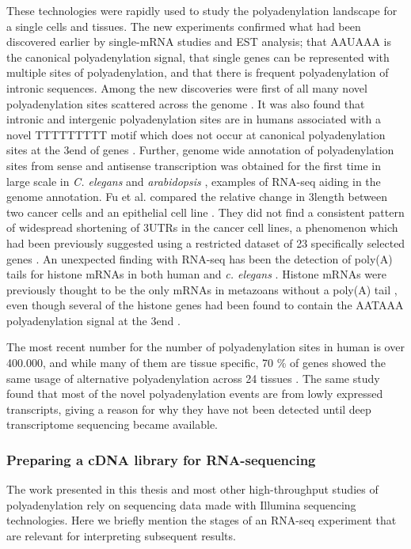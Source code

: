 These technologies were rapidly used to study the polyadenylation landscape for
a single cells and tissues. The new experiments confirmed what had been
discovered earlier by single-mRNA studies and EST analysis; that AAUAAA is the
canonical polyadenylation signal, that single genes can be represented with
multiple sites of polyadenylation, and that there is frequent polyadenylation
of intronic sequences. Among the new discoveries were first of all many novel
polyadenylation sites scattered across the genome
\cite{ozsolak_comprehensive_2010, derti_quantitative_2012}. It was also found
that intronic and intergenic polyadenylation sites are in humans associated
with a novel TTTTTTTTT motif which does not occur at canonical polyadenylation
sites at the 3\p end of genes \cite{ozsolak_comprehensive_2010}. Further,
genome wide annotation of polyadenylation sites from sense and antisense
transcription was obtained for the first time in large scale in \textit{C.
elegans} and \textit{arabidopsis} \cite{mangone_landscape_2010,
wu_genome-wide_2011}, examples of RNA-seq aiding in the genome annotation. Fu
et al. compared the relative change in 3\p length between two cancer cells and
an epithelial cell line \cite{fu_differential_2011}. They did not find a
consistent pattern of widespread shortening of 3\p UTRs in the cancer cell
lines, a phenomenon which had been previously suggested using a restricted
dataset of 23 specifically selected genes \cite{mayr_widespread_2009-2}. An
unexpected finding with RNA-seq has been the detection of poly(A) tails for
histone mRNAs in both human and \textit{c. elegans}
\cite{mangone_landscape_2010-1, shepard_complex_2011}. Histone mRNAs were
previously thought to be the only mRNAs in metazoans without a poly(A) tail
\cite{marzluff_metabolism_2008}, even though several of the histone genes had
been found to contain the AATAAA polyadenylation signal at the 3\p end
\cite{keall_histone_2007}.

The most recent number for the number of polyadenylation sites in human is over
400.000, and while many of them are tissue specific, 70 \% of genes showed the
same usage of alternative polyadenylation across 24 tissues
\cite{derti_quantitative_2012}. The same study found that most of the novel
polyadenylation events are from lowly expressed transcripts, giving a reason
for why they have not been detected until deep transcriptome sequencing became
available. 

\subsubsection{Preparing a cDNA library for RNA-sequencing}
The work presented in this thesis and most other high-throughput studies of
polyadenylation rely on sequencing data made with Illumina sequencing
technologies. Here we briefly mention the stages of an RNA-seq
experiment that are relevant for interpreting subsequent results.

